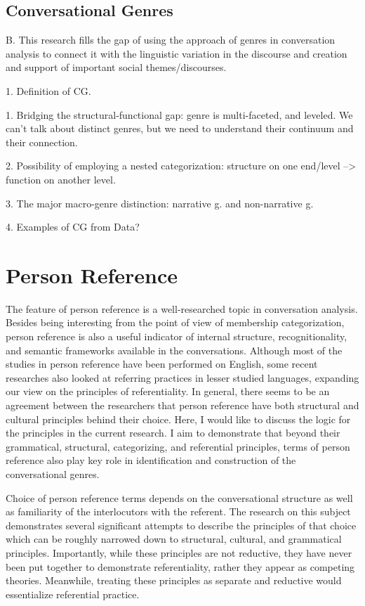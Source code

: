\documentclass[12pt]{turabian-researchpaper}
\begin{document}
\subsection{Conversational Genres}
B.	This research fills the gap of using the approach of genres in conversation analysis to connect it with the linguistic variation in the discourse and creation and support of important social themes/discourses.

1.	Definition of CG.

1.	Bridging the structural-functional gap: genre is multi-faceted, and leveled. We can’t talk about distinct genres, but we need to understand their continuum and their connection. 

2.	Possibility of employing a nested categorization: structure on one end/level --> function on another level.

3.	The major macro-genre distinction: narrative g. and non-narrative g. 

4.	Examples of CG from Data?

\section{Person Reference}
The feature of person reference is a well-researched topic in conversation analysis. Besides being interesting from the point of view of membership categorization, person reference is also a useful indicator of internal structure, recognitionality, and semantic frameworks available in the conversations. Although most of the studies in person reference have been performed on English, some recent researches also looked at referring practices in lesser studied languages, expanding our view on the principles of referentiality. In general, there seems to be an agreement between the researchers that person reference have both structural and cultural principles behind their choice. Here, I would like to discuss the logic for the principles in the current research. I aim to demonstrate that beyond their grammatical, structural, categorizing, and referential principles, terms of person reference also play key role in identification and construction of the conversational genres.

Choice of person reference terms depends on the conversational structure as well as familiarity of the interlocutors with the referent. The research on this subject demonstrates several significant attempts to describe the principles of that choice which can be roughly narrowed down to structural, cultural, and grammatical principles. Importantly, while these principles are not reductive, they have never been put together to demonstrate referentiality, rather they appear as competing theories. Meanwhile, treating these principles as separate and reductive would essentialize referential practice. 
\end{document}
